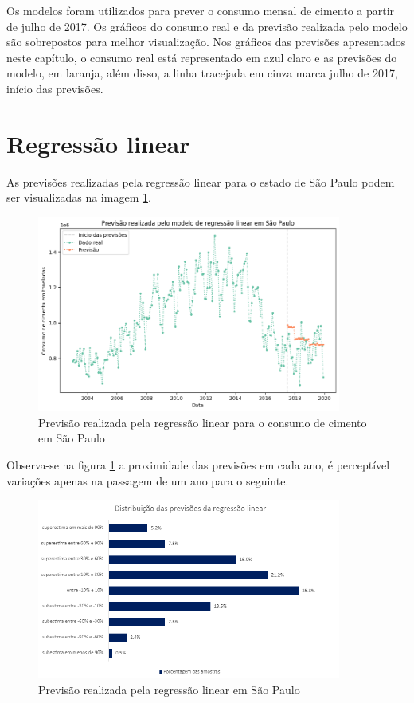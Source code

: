 Os modelos foram utilizados para prever o consumo mensal de 
cimento a partir de julho de 2017. Os gráficos do consumo real 
e da previsão realizada pelo modelo são sobrepostos para melhor
visualização. Nos gráficos das previsões apresentados neste 
capítulo, o consumo real está representado em azul claro e 
as previsões do modelo, em laranja, além disso, a linha 
tracejada em cinza marca julho de 2017, início das previsões.

\section{Regressão linear}

As previsões realizadas pela regressão linear para o estado 
de São Paulo podem ser visualizadas na imagem \ref{prev-sp-rg}.

\begin{figure}[H]
    \centering
    \includegraphics[width=10cm]{../figuras/graficos/reg_lin/prev_sp.png}
    \caption{Previsão realizada pela regressão linear para o 
    consumo de cimento em São Paulo}
    \label{prev-sp-rg}
\end{figure}

Observa-se na figura \ref{prev-sp-rg} a proximidade das previsões 
em cada ano, é perceptível variações apenas na passagem de um 
ano para o seguinte.

\begin{figure}[H]
    \centering
    \includegraphics[width=10cm]{../figuras/graficos/reg_lin/erro-perc-rg.png}
    \caption{Previsão realizada pela regressão linear em São Paulo}
    \label{consumo-sp}
\end{figure}


